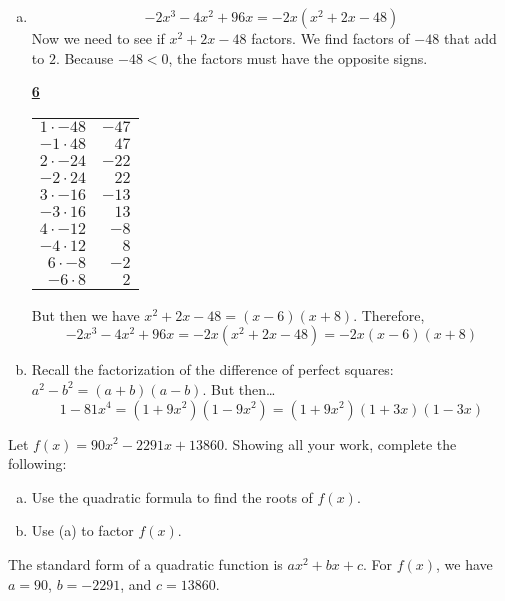 \documentclass[12pt,letterpaper]{exam}
\begin{document}
\begin{questions}
\sol 
\begin{enumerate}[(a)]
\item 
	\[
	-2x^3 - 4x^2 + 96x= -2x(x^2 + 2x - 48)
	\] 
Now we need to see if $x^2 + 2x - 48$ factors. We find factors of $-48$ that add to $2$. Because $-48 < 0$, the factors must have the opposite signs. 
	\begin{table}[!ht]
	\centering
	\underline{\bfseries 6} \pvspace{0.2cm}
	\begin{tabular}{rr}
	$1 \cdot -48$ & $-47$ \\
	$-1 \cdot 48$ & $47$ \\
	$2 \cdot -24$ & $-22$ \\
	$-2 \cdot 24$ & $22$ \\
	$3 \cdot -16$ & $-13$ \\
	$-3 \cdot 16$ & $13$ \\
	$4 \cdot -12$ & $-8$ \\
	$-4 \cdot 12$ & $8$ \\
	$6 \cdot -8$ & $-2$ \\ \hline
	\multicolumn{1}{|r}{$-6 \cdot 8$} & \multicolumn{1}{r|}{$2$} \\ \hline
	\end{tabular}
	\end{table}
But then we have $x^2 + 2x - 48= (x - 6)(x + 8)$. Therefore, 
	\[
	-2x^3 - 4x^2 + 96x= -2x(x^2 + 2x - 48)= -2x(x - 6)(x + 8)
	\]

\item Recall the factorization of the difference of perfect squares: $a^2 - b^2= (a + b)(a - b)$. But then\dots
	\[
	1 - 81x^4= (1 + 9x^2)(1 - 9x^2)= (1 + 9x^2)(1 + 3x)(1 - 3x)
	\]
\end{enumerate}



\newpage
\question[10] Let $f(x)= 90x^2 - 2291x + 13860$. Showing all your work, complete the following:
	\begin{enumerate}[(a)]
	\item Use the quadratic formula to find the roots of $f(x)$.
	\item Use (a) to factor $f(x)$. 
	\end{enumerate} \pspace

\sol \sol The standard form of a quadratic function is $ax^2 + bx + c$. For $f(x)$, we have $a= 90$, $b= -2291$, and $c= 13860$. \pspace


\end{questions}
\end{document}
